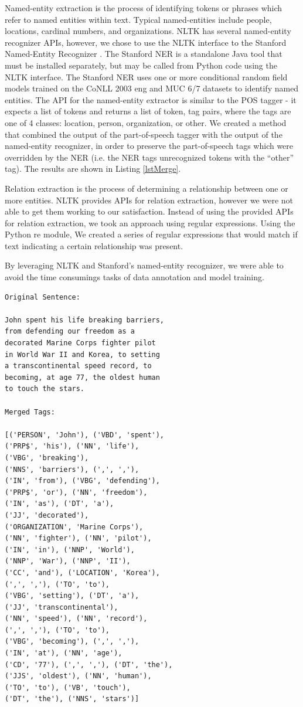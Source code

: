 \documentclass{chi2009}
\begin{document}
Named-entity extraction is the process of identifying tokens or phrases which refer to named entities within text.  Typical named-entities include people, locations, cardinal numbers, and organizations.  NLTK has several named-entity recognizer APIs, however, we chose to use the NLTK interface to the Stanford Named-Entity Recognizer \cite{stanfordner}.  The Stanford NER is a standalone Java tool that must be installed separately, but may be called from Python code using the NLTK interface.  The Stanford NER uses one or more conditional random field models trained on the CoNLL 2003 eng \cite{conll2003} and MUC 6/7 \cite{muc6} datasets to identify named entities.  The API for the named-entity extractor is similar to the POS tagger - it expects a list of tokens and returns a list of token, tag pairs, where the tags are one of 4 classes: location, person, organization, or other. We created a method that combined the output of the part-of-speech tagger with the output of the named-entity recognizer, in order to preserve the part-of-speech tags which were overridden by the NER (i.e. the NER tags unrecognized tokens with the ``other'' tag).  The results are shown in Listing \ref{lstMerge}.

Relation extraction is the process of determining a relationship between one or more entities.  NLTK provides APIs for relation extraction, however we were not able to get them working to our satisfaction.  Instead of using the provided APIs for relation extraction, we took an approach using regular expressions.  Using the Python re module, We created a series of regular expressions that would match if text indicating a certain relationship was present.

By leveraging NLTK and Stanford's named-entity recognizer, we were able to avoid the time consumings tasks of data annotation and model training. 

\begin{lstlisting}[caption=Merged Tags Example, label=lstMerge]
Original Sentence:

John spent his life breaking barriers,
from defending our freedom as a 
decorated Marine Corps fighter pilot 
in World War II and Korea, to setting
a transcontinental speed record, to 
becoming, at age 77, the oldest human
to touch the stars.

Merged Tags:

[('PERSON', 'John'), ('VBD', 'spent'),
('PRP$', 'his'), ('NN', 'life'), 
('VBG', 'breaking'), 
('NNS', 'barriers'), (',', ','), 
('IN', 'from'), ('VBG', 'defending'),
('PRP$', 'or'), ('NN', 'freedom'),
('IN', 'as'), ('DT', 'a'), 
('JJ', 'decorated'), 
('ORGANIZATION', 'Marine Corps'), 
('NN', 'fighter'), ('NN', 'pilot'), 
('IN', 'in'), ('NNP', 'World'), 
('NNP', 'War'), ('NNP', 'II'), 
('CC', 'and'), ('LOCATION', 'Korea'), 
(',', ','), ('TO', 'to'), 
('VBG', 'setting'), ('DT', 'a'), 
('JJ', 'transcontinental'), 
('NN', 'speed'), ('NN', 'record'), 
(',', ','), ('TO', 'to'), 
('VBG', 'becoming'), (',', ','), 
('IN', 'at'), ('NN', 'age'), 
('CD', '77'), (',', ','), ('DT', 'the'), 
('JJS', 'oldest'), ('NN', 'human'), 
('TO', 'to'), ('VB', 'touch'), 
('DT', 'the'), ('NNS', 'stars')]
\end{lstlisting}
 
\end{document}
